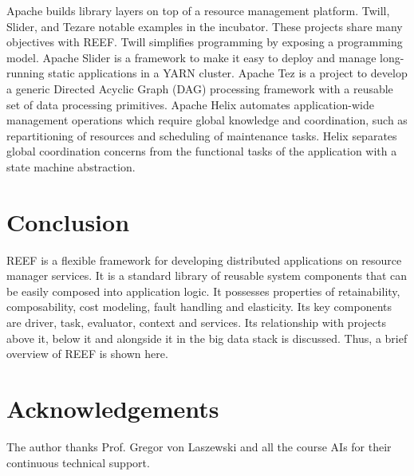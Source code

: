 \documentclass[9pt,twocolumn,twoside]{../../styles/osajnl}
\begin{document}
Apache builds library layers on top of a resource management
platform. Twill\CE, Slider\CE, and Tez\CE are notable examples in the
incubator. These projects share many objectives with REEF. Twill
simplifies programming by exposing a programming model. Apache Slider
is a framework to make it easy to deploy and manage long-running
static applications in a YARN cluster. Apache Tez is a project to
develop a generic Directed Acyclic Graph (DAG) processing framework
with a reusable set of data processing primitives. Apache Helix
automates application-wide management operations which require global
knowledge and coordination, such as repartitioning of resources and
scheduling of maintenance tasks. Helix separates global coordination
concerns from the functional tasks of the application with a state
machine abstraction.
\section{Conclusion}

REEF is a flexible framework for developing distributed applications
on resource manager services. It is a standard library of reusable
system components that can be easily composed into application
logic. It possesses properties of retainability, composability, cost
modeling, fault handling and elasticity. Its key components are
driver, task, evaluator, context and services. Its relationship with
projects above it, below it and alongside it in the big data stack is
discussed. Thus, a brief overview of REEF is shown here.

\section*{Acknowledgements}
The author thanks Prof. Gregor von Laszewski and all the course AIs
for their continuous technical support.



\end{document}
